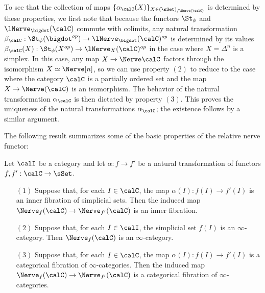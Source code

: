 \begin{remark}
To see that the collection of maps $\{ \alpha_{\calC}(X) \}_{ X \in (\sSet)_{/ \Nerve(\calC)}}$ is determined by these properties, we first note that because the functors $\St_{\phi}$ and $\lNerve_{\bigdot}(\calC)$ commute with colimits, any natural transformation $\beta_{\calC}: \St_{\phi}(\bigdot^{op}) \rightarrow \lNerve_{\bigdot}(\calC)^{op}$ is determined by its values $\beta_{\calC}(X): \St_{\phi}(X^{op}) \rightarrow \lNerve_{X}(\calC)^{op}$ in the case where $X = \Delta^n$ is a simplex. In this case, any map $X \rightarrow \Nerve \calC$ factors through the isomorphism $X \simeq \Nerve [n]$, so we can use property $(2)$ to reduce to the case where the category $\calC$ is a partially ordered set and the map $X \rightarrow \Nerve(\calC)$ is an isomorphism. The behavior of the natural transformation $\alpha_{\calC}$ is then dictated by property $(3)$. This proves the uniqueness of the natural transformations $\alpha_{\calC}$; the existence follows by a similar argument.
\end{remark}

The following result summarizes some of the basic properties of the relative nerve functor:

\begin{lemma}\label{sulken2}
Let $\calI$ be a category and
let $\alpha: f \rightarrow f'$ be a natural transformation of functors
$f,f': \calC \rightarrow \sSet$.
\begin{itemize}
\item[$(1)$] Suppose that, for each $I \in \calC$, the map $\alpha(I): f(I) \rightarrow f'(I)$ is
an inner fibration of simplicial sets. Then the induced map $\Nerve_{f}(\calC) \rightarrow
\Nerve_{f'}(\calC)$ is an inner fibration.
\item[$(2)$] Suppose that, for each $I \in \calI$, the simplicial set $f(I)$ is an $\infty$-category. Then $\Nerve_{f}(\calC)$ is an $\infty$-category.
\item[$(3)$] Suppose that, for each $I \in \calC$, the map $\alpha(I): f(I) \rightarrow f'(I)$ is
a categorical fibration of $\infty$-categories. Then the induced map
$\Nerve_{f}(\calC) \rightarrow \Nerve_{f'}(\calC)$ is a categorical fibration of $\infty$-categories.
\end{itemize}
\end{lemma}

